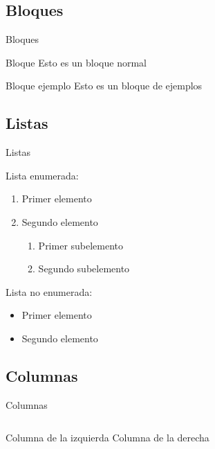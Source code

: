 \documentclass[a4paper,10pt]{beamer}
\begin{document}
\subsection{Bloques}
\begin{frame}{Bloques}
 
 \begin{block}{Bloque}
  Esto es un bloque normal
 \end{block}
 
 \vfill
 
 \begin{exampleblock}{Bloque ejemplo}
  Esto es un bloque de ejemplos
 \end{exampleblock}
\end{frame}

\subsection{Listas}
\begin{frame}{Listas}

Lista enumerada:

\begin{enumerate}
 \item Primer elemento
 \item Segundo elemento 
 
    \begin{enumerate}
     \item Primer subelemento
     \item Segundo subelemento
    \end{enumerate}

\end{enumerate}


Lista no enumerada:
\begin{itemize}
 \item Primer elemento
 \item Segundo elemento
\end{itemize}
 
\end{frame}

\subsection{Columnas}
\begin{frame}{Columnas}
 \begin{columns}[c]
  \column{1in}
  Columna de la izquierda
  \column{1in}
  Columna de la derecha
 \end{columns}

\end{frame}
\end{document}
